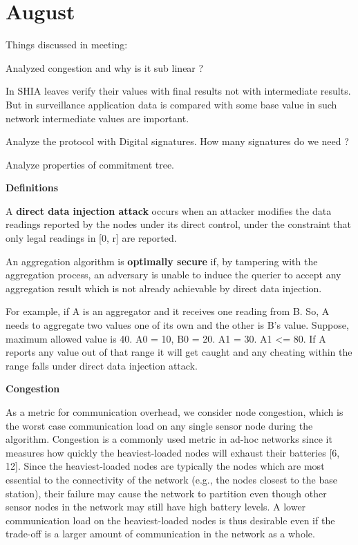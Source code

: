 \chapter{August}

Things discussed in meeting:
	
	Analyzed congestion and why is it sub linear ?
	
	In SHIA leaves verify their values with final results not with intermediate results. 
	But in surveillance application data is compared with some base value in such network intermediate values are important. 

	Analyze the protocol with Digital signatures. How many signatures do we need ?

	Analyze properties of commitment tree.

\textbf{Definitions}

A \textbf{direct data injection attack} occurs when an attacker
modifies the data readings reported by the nodes under its direct
control, under the constraint that only legal readings in [0, r] are
reported.

An aggregation algorithm is \textbf{optimally secure} if, by
tampering with the aggregation process, an adversary is unable to
induce the querier to accept any aggregation result which is not
already achievable by direct data injection.

For example,
if A is an aggregator and it receives one reading from B. So, A needs to aggregate two values one of its own and the other is B's value. Suppose, maximum allowed value is 40. A0 = 10, B0 = 20. A1 = 30. A1 <= 80. If A reports any value out of that range it will get caught and any cheating within the range falls under direct data injection attack.

\textbf{Congestion}

As a metric for communication overhead, we consider node congestion,
which is the worst case communication load on any single
sensor node during the algorithm. Congestion is a commonly
used metric in ad-hoc networks since it measures how quickly the
heaviest-loaded nodes will exhaust their batteries [6, 12]. Since the
heaviest-loaded nodes are typically the nodes which are most essential
to the connectivity of the network (e.g., the nodes closest to
the base station), their failure may cause the network to partition
even though other sensor nodes in the network may still have high
battery levels. A lower communication load on the heaviest-loaded
nodes is thus desirable even if the trade-off is a larger amount of
communication in the network as a whole.

